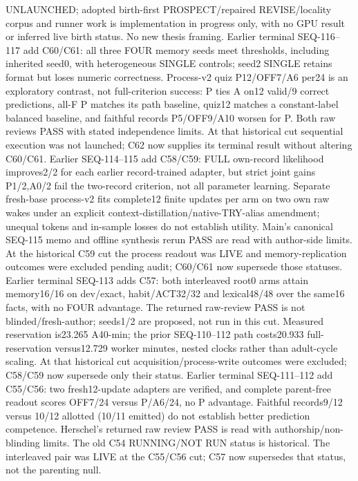 \documentclass[11pt]{article}
\begin{document}
UNLAUNCHED; adopted birth-first PROSPECT/repaired REVISE/locality corpus and
runner work is implementation in progress only, with no GPU result or inferred
live birth status. No new thesis framing. Earlier terminal SEQ-116--117 add C60/C61:
all three FOUR memory seeds meet thresholds, including inherited seed0, with
heterogeneous SINGLE controls; seed2 SINGLE retains format but loses numeric
correctness. Process-v2 quiz P12/OFF7/A6 per24 is an exploratory contrast,
not full-criterion success: P ties A on12 valid/9 correct predictions, all-F
P matches its path baseline, quiz12 matches a constant-label balanced baseline,
and faithful records P5/OFF9/A10 worsen for P. Both raw reviews PASS with stated
independence limits. At that historical cut sequential execution was not launched;
C62 now supplies its terminal result without altering C60/C61. Earlier SEQ-114--115
add C58/C59: FULL own-record
likelihood improves2/2 for each earlier record-trained adapter, but strict joint
gains P1/2,A0/2 fail the two-record criterion, not all parameter learning.
Separate fresh-base process-v2 fits complete12 finite updates per arm on two
own raw wakes under an explicit context-distillation/native-TRY-alias amendment;
unequal tokens and in-sample losses do not establish utility. Main's canonical
SEQ-115 memo and offline synthesis rerun PASS are read with author-side limits.
At the historical C59 cut the process readout was LIVE and memory-replication
outcomes were excluded pending audit; C60/C61 now supersede those statuses.
Earlier terminal SEQ-113 adds C57: both interleaved
root0 arms attain memory16/16 on dev/exact, habit/ACT32/32 and lexical48/48 over
the same16 facts, with no FOUR advantage. The returned raw-review PASS is not
blinded/fresh-author; seeds1/2 are proposed, not run in this cut. Measured
reservation is23.265 A40-min; the prior SEQ-110--112 path costs20.933 full-reservation
versus12.729 worker minutes, nested clocks rather than adult-cycle scaling.
At that historical cut acquisition/process-write outcomes were excluded;
C58/C59 now supersede only their status. Earlier terminal
SEQ-111--112 add C55/C56:
two fresh12-update adapters are verified, and complete parent-free readout
scores OFF7/24 versus P/A6/24, no P advantage. Faithful records9/12 versus
10/12 allotted (10/11 emitted) do not establish better prediction competence.
Herschel's returned raw review PASS is read with authorship/non-blinding limits.
The old C54 RUNNING/NOT RUN status is historical. The interleaved pair was
LIVE at the C55/C56 cut; C57 now supersedes that status, not the parenting null.
\end{document}
